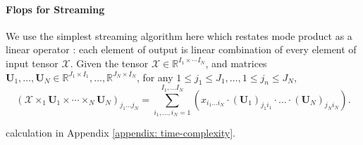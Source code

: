 \paragraph{Flops for Streaming}
We use the simplest streaming algorithm here which restates mode product as a linear operator : each element of output is linear combination of every element of input tensor $\mathscr{X}$. Given the tensor $\mathscr{X} \in \mathbb{R}^{I_1 \times \cdots I_N}$, and matrices $\mathbf{U}_1, \dots, \mathbf{U}_N \in \mathbb{R}^{J_1 \times I_1}, \dots, \mathbb{R}^{J_N \times I_N}$, for any $1 \leq j_1 \leq J_1, \dots, 1 \leq j_n \leq J_N$, 
\begin{equation} 
(\mathscr{X} \times_1 \mathbf{U}_1 \times \cdots \times_N \mathbf{U}_N)_{j_1\dots j_N} = \sum_{i_1, \dots, i_N = 1}^{I_1, \dots I_N}(x_{i_1\dots i_N}\cdot (\mathbf{U}_1)_{j_1i_1} \cdot \dots \cdot (\mathbf{U}_N)_{j_Ni_N} ).
\end{equation}

calculation in Appendix \ref{appendix: time-complexity}.


